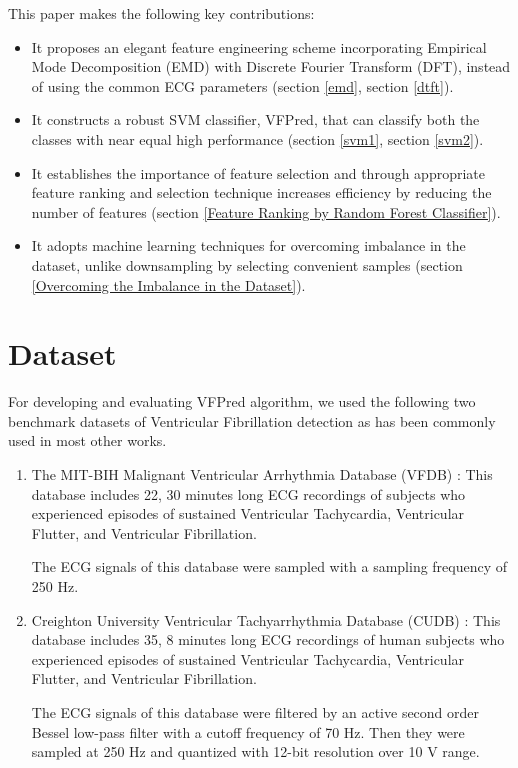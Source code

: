 \documentclass[12pt,a4paper]{article}
\begin{document}



This paper makes the following key contributions:

\begin{itemize}
  \item It proposes an elegant feature engineering scheme incorporating Empirical Mode Decomposition (EMD) with Discrete Fourier Transform (DFT), instead of using the common ECG parameters (section \ref{emd}, section \ref{dtft}).
  \item It constructs a robust SVM classifier, VFPred, that can classify both the classes with near equal high performance (section \ref{svm1}, section \ref{svm2}).
  \item It establishes the importance of feature selection and through appropriate feature ranking and selection technique increases efficiency by reducing the number of features (section \ref{Feature Ranking by Random Forest Classifier}).
  \item It adopts machine learning techniques for overcoming imbalance in the dataset, unlike downsampling by selecting convenient samples (section \ref{Overcoming the Imbalance in the Dataset}).
\end{itemize}

\section{Dataset}

For developing and evaluating VFPred algorithm, we used the following two benchmark datasets of Ventricular Fibrillation detection as has been commonly used in most other works.

\begin{enumerate}
  \item The MIT-BIH Malignant Ventricular Arrhythmia Database (VFDB) \cite{greenwald1986development}: This database includes 22, 30 minutes long ECG recordings of subjects who experienced episodes of sustained Ventricular Tachycardia, Ventricular Flutter, and Ventricular Fibrillation.
  
  The ECG signals of this database were sampled with a sampling frequency of 250 Hz.
  \item Creighton University Ventricular Tachyarrhythmia Database (CUDB) \cite{nolle1986crei} : This database includes 35, 8 minutes long ECG recordings of human subjects who experienced episodes of sustained Ventricular Tachycardia, Ventricular Flutter, and Ventricular Fibrillation. 
  
  The ECG signals of this database were filtered by an active second order Bessel low-pass filter with a cutoff frequency of 70 Hz. Then they were sampled at 250 Hz and quantized with 12-bit resolution over 10 V range.
  
\end{enumerate}
\end{document}

